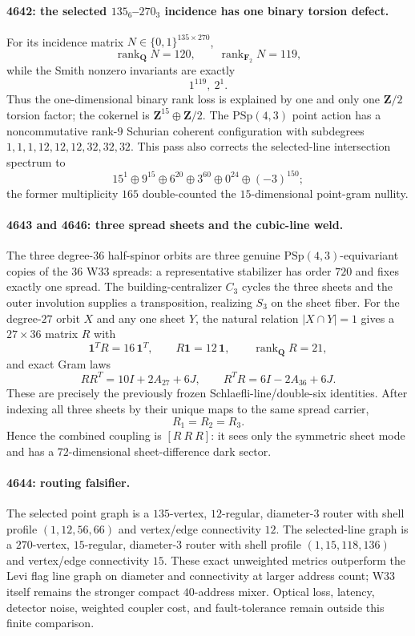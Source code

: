 \paragraph{4642: the selected $135_6$--$270_3$ incidence has one binary torsion defect.}
For its incidence matrix $N\in\{0,1\}^{135\times270}$,
\[
\operatorname{rank}_{\mathbf Q}N=120,
\qquad
\operatorname{rank}_{\mathbf F_2}N=119,
\]
while the Smith nonzero invariants are exactly
\[
1^{119},\ 2^1.
\]
Thus the one-dimensional binary rank loss is explained by one and only one
$\mathbf Z/2$ torsion factor; the cokernel is
$\mathbf Z^{15}\oplus\mathbf Z/2$.
The $\mathrm{PSp}(4,3)$ point action has a noncommutative rank-$9$ Schurian
coherent configuration with subdegrees
$1,1,1,12,12,12,32,32,32$.
This pass also corrects the selected-line intersection spectrum to
\[
15^1\oplus9^{15}\oplus6^{20}\oplus3^{60}\oplus0^{24}\oplus(-3)^{150};
\]
the former multiplicity $165$ double-counted the $15$-dimensional point-gram
nullity.

\paragraph{4643 and 4646: three spread sheets and the cubic-line weld.}
The three degree-$36$ half-spinor orbits are three genuine
$\mathrm{PSp}(4,3)$-equivariant copies of the $36$ W33 spreads: a representative
stabilizer has order $720$ and fixes exactly one spread.  The building-centralizer
$C_3$ cycles the three sheets and the outer involution supplies a transposition,
realizing $S_3$ on the sheet fiber.
For the degree-$27$ orbit $X$ and any one sheet $Y$, the natural relation
$|X\cap Y|=1$ gives a $27\times36$ matrix $R$ with
\[
\mathbf 1^TR=16\,\mathbf1^T,
\qquad R\mathbf1=12\,\mathbf1,
\qquad \operatorname{rank}_{\mathbf Q}R=21,
\]
and exact Gram laws
\[
RR^T=10I+2A_{27}+6J,
\qquad
R^TR=6I-2A_{36}+6J.
\]
These are precisely the previously frozen Schlaefli-line/double-six identities.
After indexing all three sheets by their unique maps to the same spread carrier,
\[
R_1=R_2=R_3.
\]
Hence the combined coupling is $[R\ R\ R]$: it sees only the symmetric sheet
mode and has a $72$-dimensional sheet-difference dark sector.

\paragraph{4644: routing falsifier.}
The selected point graph is a $135$-vertex, $12$-regular, diameter-$3$ router
with shell profile $(1,12,56,66)$ and vertex/edge connectivity $12$.
The selected-line graph is a $270$-vertex, $15$-regular, diameter-$3$ router
with shell profile $(1,15,118,136)$ and vertex/edge connectivity $15$.
These exact unweighted metrics outperform the Levi flag line graph on diameter
and connectivity at larger address count; W33 itself remains the stronger compact
$40$-address mixer.  Optical loss, latency, detector noise, weighted coupler cost,
and fault-tolerance remain outside this finite comparison.

